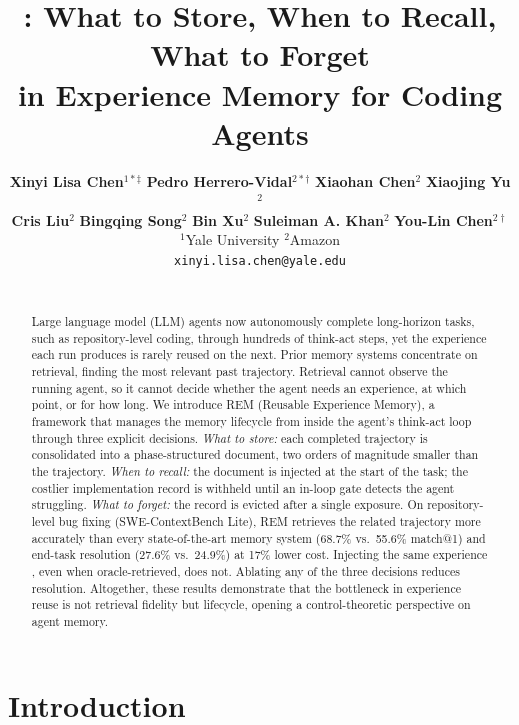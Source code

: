\documentclass{article}
\title{\sysname{}: What to Store, When to Recall, What to Forget\\in Experience Memory for Coding Agents}
\author{%
  \textbf{Xinyi Lisa Chen}$^{1*\ddagger}$ \quad \textbf{Pedro Herrero-Vidal}$^{2*\dagger}$ \quad \textbf{Xiaohan Chen}$^{2}$ \quad \textbf{Xiaojing Yu}$^{2}$ \\
  \textbf{Cris Liu}$^{2}$ \quad \textbf{Bingqing Song}$^{2}$ \quad \textbf{Bin Xu}$^{2}$ \quad \textbf{Suleiman A. Khan}$^{2}$ \quad \textbf{You-Lin Chen}$^{2\dagger}$ \\[0.6em]
  $^{1}$Yale University \qquad $^{2}$Amazon \\
  \texttt{xinyi.lisa.chen@yale.edu} \\
  \rev{\texttt{\{phvidal, chxh, yyxjing, licris\}@amazon.com}} \\
  \rev{\texttt{\{bingqiso, binxu, suleimkh, cyoulin\}@amazon.com}}
}
\newcommand{\sysname}{REM}
\begin{document}
\maketitle
\def\thefootnote{*}
\def\thefootnote{$\dagger$}
\def\thefootnote{$\ddagger$}
\def\thefootnote{\arabic{footnote}}
\setcounter{footnote}{0}

\trackbanner

\begin{abstract}
Large language model (LLM) agents now autonomously complete long-horizon tasks, such as repository-level coding, through hundreds of think-act steps, yet the experience each run produces is rarely reused on the next. Prior memory systems concentrate on retrieval, finding the most relevant past trajectory. Retrieval cannot observe the running agent, so it cannot decide whether the agent needs an experience, at which point, or for how long. We introduce \sysname{} (Reusable Experience Memory), a framework that manages the memory lifecycle from inside the agent's think-act loop through three explicit decisions. \emph{What to store:} each completed trajectory is consolidated into a phase-structured document, two orders of magnitude smaller than the trajectory. \emph{When to recall:} the document is injected at the start of the task; the costlier implementation record is withheld until an in-loop gate detects the agent struggling. \emph{What to forget:} the record is evicted after a single exposure. On repository-level bug fixing (SWE-ContextBench Lite), \sysname{} retrieves the related trajectory more accurately than every state-of-the-art memory system (68.7\% vs.\ 55.6\% match@1) and  end-task resolution (27.6\% vs.\ 24.9\%) at 17\% lower cost. Injecting the same experience , even when oracle-retrieved, does not. Ablating any of the three decisions reduces resolution. Altogether, these results demonstrate that the bottleneck in experience reuse is not retrieval fidelity but  lifecycle, opening a control-theoretic perspective on agent memory.
\end{abstract}

\section{Introduction}
\label{sec:intro}
\end{document}
